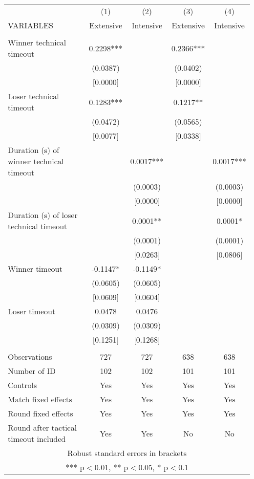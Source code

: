 \documentclass[]{article}
\begin{document}
\begin{tabular}{lcccc} \hline
 & (1) & (2) & (3) & (4) \\
VARIABLES & Extensive & Intensive & Extensive & Intensive \\ \hline
 &  &  &  &  \\
Winner technical timeout & 0.2298*** &  & 0.2366*** &  \\
 & (0.0387) &  & (0.0402) &  \\
 & [0.0000] &  & [0.0000] &  \\
Loser technical timeout & 0.1283*** &  & 0.1217** &  \\
 & (0.0472) &  & (0.0565) &  \\
 & [0.0077] &  & [0.0338] &  \\
Duration (s) of winner technical timeout &  & 0.0017*** &  & 0.0017*** \\
 &  & (0.0003) &  & (0.0003) \\
 &  & [0.0000] &  & [0.0000] \\
Duration (s) of loser technical timeout &  & 0.0001** &  & 0.0001* \\
 &  & (0.0001) &  & (0.0001) \\
 &  & [0.0263] &  & [0.0806] \\
Winner timeout & -0.1147* & -0.1149* &  &  \\
 & (0.0605) & (0.0605) &  &  \\
 & [0.0609] & [0.0604] &  &  \\
Loser timeout & 0.0478 & 0.0476 &  &  \\
 & (0.0309) & (0.0309) &  &  \\
 & [0.1251] & [0.1268] &  &  \\
 &  &  &  &  \\
Observations & 727 & 727 & 638 & 638 \\
Number of ID & 102 & 102 & 101 & 101 \\
Controls & Yes & Yes & Yes & Yes \\
Match fixed effects & Yes & Yes & Yes & Yes \\
Round fixed effects & Yes & Yes & Yes & Yes \\
 Round after tactical timeout included & Yes & Yes & No & No \\ \hline
\multicolumn{5}{c}{ Robust standard errors in brackets} \\
\multicolumn{5}{c}{ *** p$<$0.01, ** p$<$0.05, * p$<$0.1} \\
\end{tabular}
\end{document}
